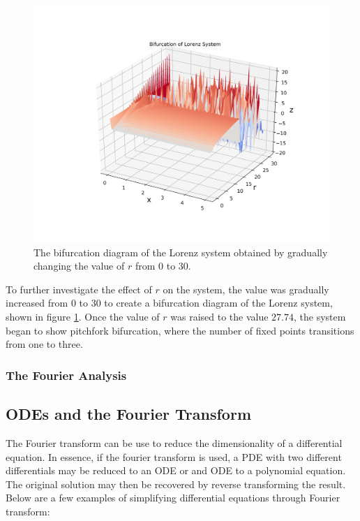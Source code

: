 \documentclass[twocolumn]{article}
\begin{document}
\begin{figure}
  \includegraphics[width=\linewidth]{bifurcation.png}
  \caption{
    The bifurcation diagram of the Lorenz system obtained by gradually changing
    the value of $r$ from $0$ to $30$.
  }
  \label{fig:bifurcation}
\end{figure}

To further investigate the effect of $r$ on the system, the value was gradually
increased from $0$ to $30$ to create a bifurcation diagram of the Lorenz system,
shown in figure \ref{fig:bifurcation}. Once the value of $r$ was raised to the
value $27.74$, the system began to show pitchfork bifurcation, where the number
of fixed points transitions from one to three.

\subsubsection{The Fourier Analysis}

\subsection{ODEs and the Fourier Transform}
The Fourier transform can be use to reduce the dimensionality of a differential equation. In essence, if the fourier transform is used, a PDE with two different differentials may be reduced to an ODE or and ODE to a polynomial equation. The original solution may then be recovered by reverse transforming the result. Below are a few examples of simplifying differential equations through Fourier transform:
\end{document}
